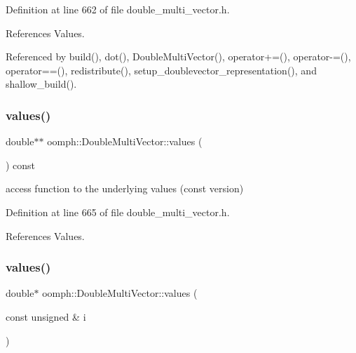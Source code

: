 Definition at line 662 of file double\+\_\+multi\+\_\+vector.\+h.



References Values.



Referenced by build(), dot(), Double\+Multi\+Vector(), operator+=(), operator-\/=(), operator==(), redistribute(), setup\+\_\+doublevector\+\_\+representation(), and shallow\+\_\+build().

\mbox{\label{classoomph_1_1DoubleMultiVector_a36a7c886943d35cb36a498f57dbd1964}} 
\subsubsection{\texorpdfstring{values()}{values()}\hspace{0.1cm}{\footnotesize\ttfamily [2/4]}}
{\footnotesize\ttfamily double$\ast$$\ast$ oomph\+::\+Double\+Multi\+Vector\+::values (\begin{DoxyParamCaption}{ }\end{DoxyParamCaption}) const\hspace{0.3cm}{\ttfamily [inline]}}



access function to the underlying values (const version) 



Definition at line 665 of file double\+\_\+multi\+\_\+vector.\+h.



References Values.

\mbox{\label{classoomph_1_1DoubleMultiVector_a1c6ed33851839407108fd33650d332cb}} 
\subsubsection{\texorpdfstring{values()}{values()}\hspace{0.1cm}{\footnotesize\ttfamily [3/4]}}
{\footnotesize\ttfamily double$\ast$ oomph\+::\+Double\+Multi\+Vector\+::values (\begin{DoxyParamCaption}\item[{const unsigned \&}]{i }\end{DoxyParamCaption})\hspace{0.3cm}{\ttfamily [inline]}}



